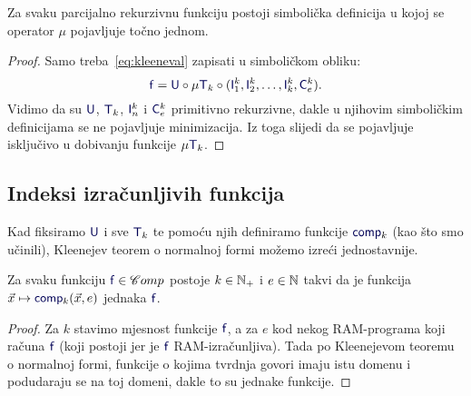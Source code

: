 \begin{korolar}[{name=[jedna minimizacija je dovoljna]}]
Za svaku parcijalno rekurzivnu funkciju postoji simbolička definicija u kojoj se operator $\mu$ pojavljuje točno jednom.
\end{korolar}
\begin{proof}
Samo treba~\eqref{eq:kleeneval} zapisati u simboličkom obliku:
\begin{equation}
    \f f=\f U\circ\mu\f T_k\circ(\f I_1^k,\f I_2^k,\dotsc,\f I_k^k,\f C_e^k)\text.
\end{equation}
Vidimo da su $\f U$, $\f T_k$, $\f I_n^k$ i $\f C_e^k$ primitivno rekurzivne, dakle u njihovim simboličkim definicijama se ne pojavljuje minimizacija. Iz toga slijedi da se pojavljuje isključivo u dobivanju funkcije $\mu\f T_k$.
\end{proof}


\subsection{Indeksi izračunljivih funkcija}

Kad fiksiramo $\f U$ i sve $\f T_k$ te pomoću njih definiramo funkcije $\f{comp}_k$ (kao što smo učinili), Kleenejev teorem o normalnoj formi možemo izreći jednostavnije.

\begin{korolar}[{name=[svaka izračunljiva funkcija je specijalizacija univerzalne]}]\label{kor:pimi}
Za svaku funkciju $\f f\in\mathscr Comp$ postoje $k\in{\mathbb N}_+$ i $e\in{\mathbb N}$ takvi da je funkcija $\vec x\mapsto\f{comp}_k(\vec x,e)$ jednaka $\f f$.
\end{korolar}

\begin{proof}
Za $k$ stavimo mjesnost funkcije $\f f$, a za $e$ kod nekog RAM-programa koji računa $\f f$ (koji postoji jer je $\f f$ RAM-izračunljiva). Tada po Kleenejevom teoremu o normalnoj formi, funkcije o kojima tvrdnja govori imaju istu domenu i podudaraju se na toj domeni, dakle to su jednake funkcije.
\end{proof}

